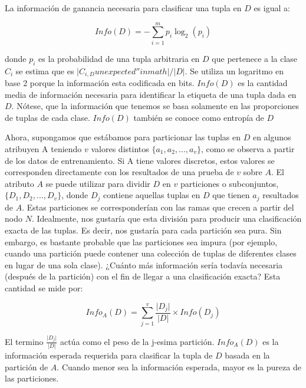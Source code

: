 La información de ganancia necesaria para clasificar una tupla en
$D$ es igual a:

\begin{equation}
Info(D)=-{\displaystyle \sum_{i=1}^{m}p_{i}\log_{2}(p_{i})}
\end{equation}

donde $p_{i}$ es la probabilidad de una tupla arbitraria en $D$
que pertenece a la clase $C_{i}$ se estima que es $\lvert C_{i,D}unexpected''inmath\rvert/\lvert D\rvert$.
Se utiliza un logaritmo en base 2 porque la información esta codificada
en bits. $Info(D)$ es la cantidad media de información necesaria
para identificar la etiqueta de una tupla dada en $D$. Nótese, que
la información que tenemos se basa solamente en las proporciones de
tuplas de cada clase. $Info(D)$ también se conoce como entropía de
$D$

Ahora, supongamos que estábamos para particionar las tuplas en $D$
en algunos atribuyen A teniendo $v$ valores distintos $\{a_{1},a_{2},...,a_{v}\}$,
como se observa a partir de los datos de entrenamiento. Si A tiene
valores discretos, estos valores se corresponden directamente con
los resultados de una prueba de $v$ sobre $A$. El atributo $A$
se puede utilizar para dividir $D$ en $v$ particiones o subconjuntos,
$\{D_{1},D_{2},...,D_{v}\}$, donde $D_{j}$ contiene aquellas tuplas
en $D$ que tienen $a_{j}$ resultados de $A$. Estas particiones
se corresponderían con las ramas que crecen a partir del nodo $N$.
Idealmente, nos gustaría que esta división para producir una clasificación
exacta de las tuplas. Es decir, nos gustaría para cada partición sea
pura. Sin embargo, es bastante probable que las particiones sea impura
(por ejemplo, cuando una partición puede contener una colección de
tuplas de diferentes clases en lugar de una sola clase). ¿Cuánto más
información sería todavía necesaria (después de la partición) con
el fin de llegar a una clasificación exacta? Esta cantidad se mide
por:

\begin{equation}
Info_{A}(D)={\displaystyle \sum_{j=1}^{v}{\displaystyle \frac{\lvert D_{j}\rvert}{\lvert D\rvert}\times Info(D_{j})}}
\end{equation}

El termino ${\displaystyle \frac{\lvert D_{j}\rvert}{\lvert D\rvert}}$
actúa como el peso de la j-esima partición. $Info_{A}(D)$ es la información
esperada requerida para clasificar la tupla de $D$ basada en la partición
de $A$. Cuando menor sea la información esperada, mayor es la pureza
de las particiones.

